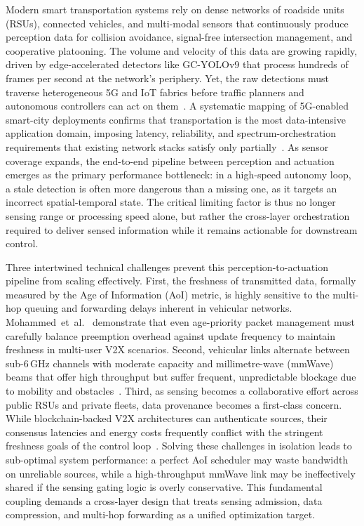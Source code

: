 \documentclass[final,3p,times,review,sort&compress]{elsarticle}
\begin{document}
Modern smart transportation systems rely on dense networks of roadside units (RSUs), connected vehicles, and multi-modal sensors that continuously produce perception data for collision avoidance, signal-free intersection management, and cooperative platooning. The volume and velocity of this data are growing rapidly, driven by edge-accelerated detectors like GC-YOLOv9 that process hundreds of frames per second at the network's periphery. Yet, the raw detections must traverse heterogeneous 5G and IoT fabrics before traffic planners and autonomous controllers can act on them~\cite{AN2024277}. A systematic mapping of 5G-enabled smart-city deployments confirms that transportation is the most data-intensive application domain, imposing latency, reliability, and spectrum-orchestration requirements that existing network stacks satisfy only partially~\cite{YANG2022200065}. As sensor coverage expands, the end-to-end pipeline between perception and actuation emerges as the primary performance bottleneck: in a high-speed autonomy loop, a stale detection is often more dangerous than a missing one, as it targets an incorrect spatial-temporal state. The critical limiting factor is thus no longer sensing range or processing speed alone, but rather the cross-layer orchestration required to deliver sensed information while it remains actionable for downstream control.

Three intertwined technical challenges prevent this perception-to-actuation pipeline from scaling effectively. First, the freshness of transmitted data, formally measured by the Age of Information (AoI) metric, is highly sensitive to the multi-hop queuing and forwarding delays inherent in vehicular networks. Mohammed~et~al.~\cite{MOHAMMED2025111706} demonstrate that even age-priority packet management must carefully balance preemption overhead against update frequency to maintain freshness in multi-user V2X scenarios. Second, vehicular links alternate between sub-6\,GHz channels with moderate capacity and millimetre-wave (mmWave) beams that offer high throughput but suffer frequent, unpredictable blockage due to mobility and obstacles~\cite{HE2023100610}. Third, as sensing becomes a collaborative effort across public RSUs and private fleets, data provenance becomes a first-class concern. While blockchain-backed V2X architectures can authenticate sources, their consensus latencies and energy costs frequently conflict with the stringent freshness goals of the control loop~\cite{SARKAR2022100533}. Solving these challenges in isolation leads to sub-optimal system performance: a perfect AoI scheduler may waste bandwidth on unreliable sources, while a high-throughput mmWave link may be ineffectively shared if the sensing gating logic is overly conservative. This fundamental coupling demands a cross-layer design that treats sensing admission, data compression, and multi-hop forwarding as a unified optimization target.
\end{document}
